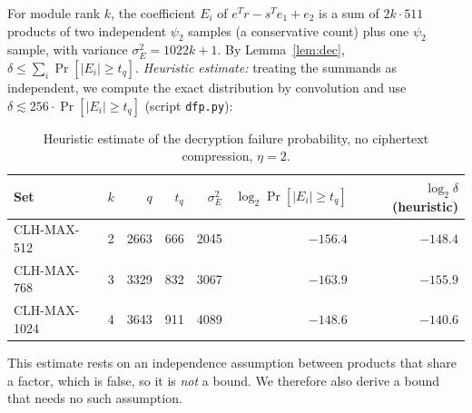 \documentclass[11pt]{article}
\theoremstyle{remark}
\begin{document}
For module rank $k$, the coefficient $E_i$ of $e^{T}r-s^{T}e_1+e_2$ is a sum of $2k\cdot511$ products of two independent $\psi_2$ samples (a conservative count) plus one $\psi_2$ sample, with variance $\sigma_E^2=1022k+1$. By Lemma~\ref{lem:dec}, $\delta\le\sum_{i}\Pr[|E_i|\ge t_q]$. \emph{Heuristic estimate:} treating the summands as independent, we compute the exact distribution by convolution and use $\delta\lesssim256\cdot\Pr[|E_i|\ge t_q]$ (script \texttt{dfp.py}):
\begin{table}[h]\centering
\begin{tabular}{lrrrrrr}\toprule
Set & $k$ & $q$ & $t_q$ & $\sigma_E^2$ & $\log_2\Pr[|E_i|\ge t_q]$ & $\log_2\delta$ (heuristic)\\\midrule
CLH-MAX-512 & 2 & 2663 & 666 & 2045 & $-156.4$ & $-148.4$\\
CLH-MAX-768 & 3 & 3329 & 832 & 3067 & $-163.9$ & $-155.9$\\
CLH-MAX-1024 & 4 & 3643 & 911 & 4089 & $-148.6$ & $-140.6$\\\bottomrule
\end{tabular}
\caption{Heuristic estimate of the decryption failure probability, no ciphertext compression, $\eta=2$.}\label{tab:dfp}
\end{table}
This estimate rests on an independence assumption between products that share a factor, which is false, so it is \emph{not} a bound. We therefore also derive a bound that needs no such assumption.
\end{document}

